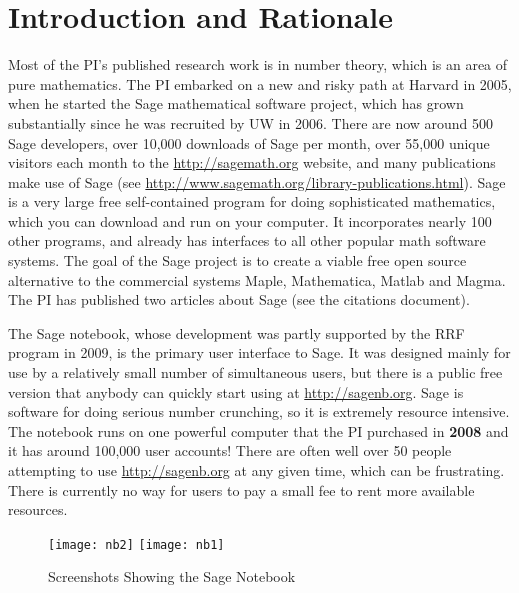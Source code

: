\documentclass[11pt]{article}
\begin{document}
\section{Introduction and Rationale}


Most of the PI's published research work is in number theory, which is
an area of pure mathematics.  The PI embarked on a new and risky path
at Harvard in 2005, when he started the Sage mathematical software
project, which has grown substantially since he was recruited by UW in
2006.  There are now around 500 Sage developers, over 10,000 downloads
of Sage per month, over 55,000 unique visitors each month to the
\url{http://sagemath.org} website, and many publications make use of
Sage (see \url{http://www.sagemath.org/library-publications.html}).
Sage is a very large free
self-contained program for doing sophisticated mathematics, which you
can download and run on your computer.  It incorporates nearly 100
other programs, and already has interfaces to all other popular math
software systems.  The goal of the Sage project is to create a viable
free open source alternative to the commercial systems Maple,
Mathematica, Matlab and Magma.  The PI has published two articles
about Sage (see the citations document).

The Sage notebook, whose development was partly supported by the RRF
program in 2009, is the primary user interface to Sage.  It was
designed mainly for use by a relatively small number of simultaneous
users, but there is a public free version that anybody can quickly
start using at \url{http://sagenb.org}.  Sage is software for doing
serious number crunching, so it is extremely resource intensive.  The
notebook runs on one powerful computer that the PI purchased in {\bf
  2008} and it has around 100,000 user accounts!  There are often well
over 50 people attempting to use \url{http://sagenb.org} at any given
time, which can be frustrating.  There is currently no way for users
to pay a small fee to rent more available resources.

\begin{center}
\begin{figure}[ht]
\hfill
\texttt{[image: nb2]}
\hfill
\texttt{[image: nb1]}
\hfill
\mbox{}
\caption{Screenshots Showing the Sage Notebook\label{fig:sagenb}}
\end{figure}
\end{center}
\end{document}
